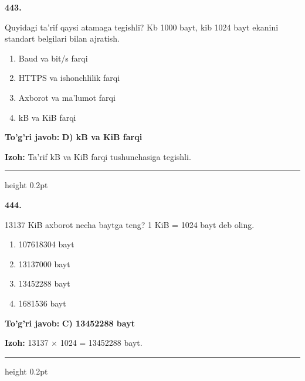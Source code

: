 \documentclass[10pt,a4paper,oneside]{article}
\begin{document}
\noindent\textbf{\color{ink}443.}
\par
Quyidagi ta'rif qaysi atamaga tegishli? Kb 1000 bayt, kib 1024 bayt ekanini standart belgilari bilan ajratish.
\begin{enumerate}[label=\Alph*),leftmargin=9mm]
\item Baud va bit/s farqi
\item HTTPS va ishonchlilik farqi
\item Axborot va ma'lumot farqi
\item kB va KiB farqi
\end{enumerate}
\begin{tcolorbox}[enhanced,breakable,colback=teal!4,colframe=teal!50!black,boxrule=0.5pt,arc=1.1mm,left=3mm,right=3mm,top=1.7mm,bottom=1.7mm,before skip=2mm,after skip=2mm]
\textbf{\color{teal}To'g'ri javob:} \textbf{D) kB va KiB farqi}
\par\smallskip
\textbf{Izoh:} Ta'rif kB va KiB farqi tushunchasiga tegishli.
\end{tcolorbox}
\vspace{2mm}\hrule height 0.2pt \vspace{3mm}

\noindent\textbf{\color{ink}444.}
\par
13137 KiB axborot necha baytga teng? 1 KiB = 1024 bayt deb oling.
\begin{enumerate}[label=\Alph*),leftmargin=9mm]
\item 107618304 bayt
\item 13137000 bayt
\item 13452288 bayt
\item 1681536 bayt
\end{enumerate}
\begin{tcolorbox}[enhanced,breakable,colback=teal!4,colframe=teal!50!black,boxrule=0.5pt,arc=1.1mm,left=3mm,right=3mm,top=1.7mm,bottom=1.7mm,before skip=2mm,after skip=2mm]
\textbf{\color{teal}To'g'ri javob:} \textbf{C) 13452288 bayt}
\par\smallskip
\textbf{Izoh:} 13137 \ensuremath{\times} 1024 = 13452288 bayt.
\end{tcolorbox}
\vspace{2mm}\hrule height 0.2pt \vspace{3mm}
\end{document}
